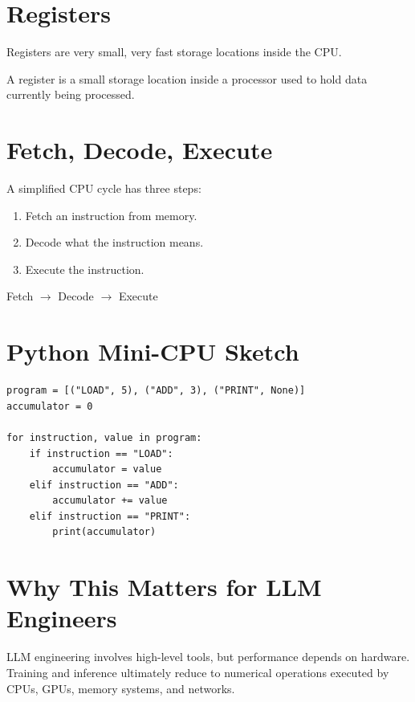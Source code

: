 \section{Registers}

Registers are very small, very fast storage locations inside the CPU.

\begin{definition}
A register is a small storage location inside a processor used to hold data currently being processed.
\end{definition}

\section{Fetch, Decode, Execute}

A simplified CPU cycle has three steps:

\begin{enumerate}
    \item Fetch an instruction from memory.
    \item Decode what the instruction means.
    \item Execute the instruction.
\end{enumerate}

\begin{center}
Fetch $\rightarrow$ Decode $\rightarrow$ Execute
\end{center}

\section{Python Mini-CPU Sketch}

\begin{lstlisting}
program = [("LOAD", 5), ("ADD", 3), ("PRINT", None)]
accumulator = 0

for instruction, value in program:
    if instruction == "LOAD":
        accumulator = value
    elif instruction == "ADD":
        accumulator += value
    elif instruction == "PRINT":
        print(accumulator)
\end{lstlisting}

\section{Why This Matters for LLM Engineers}

LLM engineering involves high-level tools, but performance depends on hardware. Training and inference ultimately reduce to numerical operations executed by CPUs, GPUs, memory systems, and networks.

